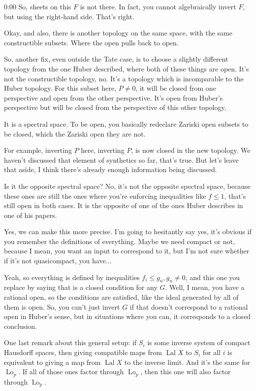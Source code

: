 \begin{unfinished}{0:00}
So, sheets on this $F$ is not there. In fact, you cannot algebraically invert $F$, but using the right-hand side. That's right.

Okay, and also, there is another topology on the same space, with the same constructible subsets. Where the open pulls back to open.

So, another fix, even outside the Tate case, is to choose a slightly different topology from the one Huber described, where both of these things are open. It's not the constructible topology, no. It's a topology which is incomparable to the Huber topology. For this subset here, $P \neq 0$, it will be closed from one perspective and open from the other perspective. It's open from Huber's perspective but will be closed from the perspective of this other topology.

It is a spectral space. To be open, you basically redeclare Zariski open subsets to be closed, which the Zariski open they are not.

For example, inverting $P$ here, inverting $P$, is now closed in the new topology. We haven't discussed that element of synthetics so far, that's true. But let's leave that aside, I think there's already enough information being discussed.

Is it the opposite spectral space? No, it's not the opposite spectral space, because these ones are still the ones where you're enforcing inequalities like $f \leq 1$, that's still open in both cases. It is the opposite of one of the ones Huber describes in one of his papers.

Yes, we can make this more precise. I'm going to hesitantly say yes, it's obvious if you remember the definitions of everything. Maybe we need compact or not, because I mean, you want an input to correspond to it, but I'm not sure whether if it's not quasicompact, you have...

Yeah, so everything is defined by inequalities $f_i \leq g_n, g_n \neq 0$, and this one you replace by saying that is a closed condition for any $G$. Well, I mean, you have a rational open, so the conditions are satisfied, like the ideal generated by all of them is open. So, you can't just invert $G$ if that doesn't correspond to a rational open in Huber's sense, but in situations where you can, it corresponds to a closed conclusion.

One last remark about this general setup: if $S_i$ is some inverse system of compact Hausdorff spaces, then giving compatible maps from $\operatorname{Lal} X$ to $S_i$ for all $i$ is equivalent to giving a map from $\operatorname{Lal} X$ to the inverse limit. And it's the same for $\operatorname{Lo}_p$. If all of those ones factor through $\operatorname{Lo}_p$, then this one will also factor through $\operatorname{Lo}_p$.


\end{unfinished}
